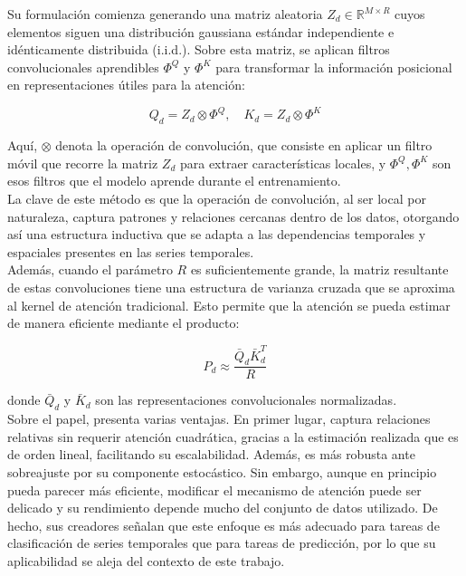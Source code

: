 Su formulación comienza generando una matriz aleatoria \( Z_d \in \mathbb{R}^{M \times R} \) cuyos elementos siguen una distribución gaussiana estándar independiente e idénticamente distribuida (i.i.d.). Sobre esta matriz, se aplican filtros convolucionales aprendibles \(\Phi^Q\) y \(\Phi^K\) para transformar la información posicional en representaciones útiles para la atención:

\begin{equation}
Q_d = Z_d \otimes \Phi^Q, \quad K_d = Z_d \otimes \Phi^K
\end{equation}

Aquí, \(\otimes\) denota la operación de convolución, que consiste en aplicar un filtro móvil que recorre la matriz \(Z_d\) para extraer características locales, y \(\Phi^Q, \Phi^K\) son esos filtros que el modelo aprende durante el entrenamiento.\\

La clave de este método es que la operación de convolución, al ser local por naturaleza, captura patrones y relaciones cercanas dentro de los datos, otorgando así una estructura inductiva que se adapta a las dependencias temporales y espaciales presentes en las series temporales.\\

Además, cuando el parámetro \(R\) es suficientemente grande, la matriz resultante de estas convoluciones tiene una estructura de varianza cruzada que se aproxima al kernel de atención tradicional. Esto permite que la atención se pueda estimar de manera eficiente mediante el producto:

\begin{equation}
	P_d \approx \frac{\bar{Q}_d \bar{K}_d^T}{R}
\end{equation}

donde \(\bar{Q}_d\) y \(\bar{K}_d\) son las representaciones convolucionales normalizadas.\\

Sobre el papel, presenta varias ventajas. En primer lugar, captura relaciones relativas sin requerir atención cuadrática, gracias a la estimación realizada que es de orden lineal, facilitando su escalabilidad. Además, es más robusta ante sobreajuste por su componente estocástico. Sin embargo, aunque en principio pueda parecer más eficiente, modificar el mecanismo de atención puede ser delicado y su rendimiento depende mucho del conjunto de datos utilizado. De hecho, sus creadores señalan que este enfoque es más adecuado para tareas de clasificación de series temporales que para tareas de predicción, por lo que su aplicabilidad se aleja del contexto de este trabajo.

